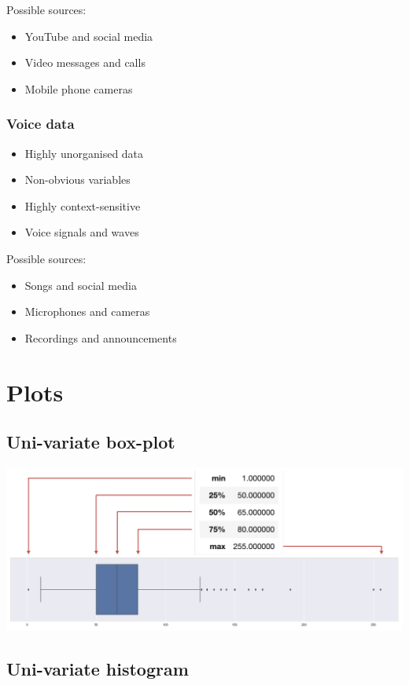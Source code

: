 \documentclass[11pt]{article}
\begin{document}
Possible sources:
\begin{itemize}
\item YouTube and social media
\item Video messages and calls
\item Mobile phone cameras
\end{itemize}

 \newpage
\subsubsection{Voice data}
\label{sec:orgcf1520d}
\begin{itemize}
\item Highly unorganised data
\item Non-obvious variables
\item Highly context-sensitive
\item Voice signals and waves
\end{itemize}

Possible sources:
\begin{itemize}
\item Songs and social media
\item Microphones and cameras
\item Recordings and announcements
\end{itemize}
\section{Plots}
\label{sec:org3e262b5}

\subsection{Uni-variate box-plot}
\label{sec:org1eb338c}
\begin{center}
\includegraphics[width=.9\linewidth]{./images/uni-variate-box-plot.png}
\end{center}
\subsection{Uni-variate histogram}
\label{sec:orgf49b1c5}
\end{document}
